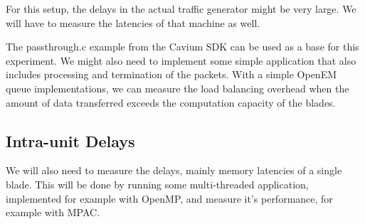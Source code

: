 For this setup, the delays in the actual traffic generator might be very large. We will have to measure the latencies of that machine as well.

The passthrough.c example from the Cavium SDK can be used as a base for this experiment. We might also need to implement some simple application that also includes processing and termination of the packets. With a simple OpenEM queue implementations, we can measure the load balancing overhead when the amount of data transferred exceeds the computation capacity of the blades.

\subsection{Intra-unit Delays}
We will also need to measure the delays, mainly memory latencies of a single blade. This will be done by running some multi-threaded application, implemented for example with OpenMP, and measure it's performance, for example with MPAC.

